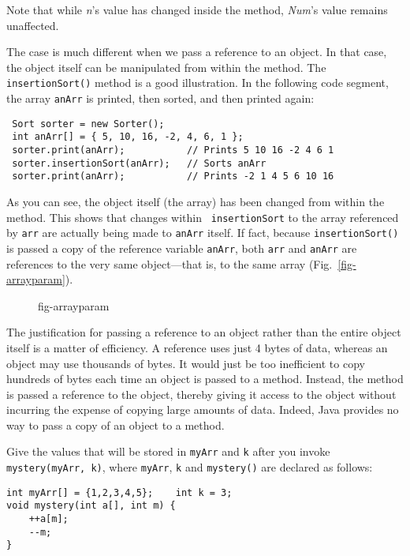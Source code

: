 \noindent Note that while {\it n}'s value has changed inside the
method, {\it Num}'s value remains unaffected.

The case is much different when we pass a reference to an object.  In
that case, the object itself can be manipulated from within the
method.  The {\tt insertionSort()} method is a good illustration.  In
the following code
segment, the array {\tt anArr} is printed, then sorted, and then printed
again:

\begin{jjjlisting}
\begin{lstlisting}
 Sort sorter = new Sorter();
 int anArr[] = { 5, 10, 16, -2, 4, 6, 1 }; 
 sorter.print(anArr);           // Prints 5 10 16 -2 4 6 1
 sorter.insertionSort(anArr);   // Sorts anArr
 sorter.print(anArr);           // Prints -2 1 4 5 6 10 16
\end{lstlisting}
\end{jjjlisting}

\noindent As you can see, the object itself (the array) has been
changed from within the method. This shows that changes within {\tt
insertionSort} to the array referenced by {\tt arr} are actually being
made to {\tt anArr} itself.  If fact, because {\tt insertionSort()} is
passed a copy of the reference variable {\tt anArr}, both {\tt arr}
and {\tt anArr} are references to the very same object---that is, to
the same array (Fig.~\ref{fig-arrayparam}).

\begin{figure}[tbh]
 {fig-arrayparam}
\end{figure}

The justification for passing a reference to an object rather than the
entire object itself is a matter of efficiency.  A reference uses just
4 bytes of data, whereas an object may use thousands of bytes.   It
would just be too inefficient to copy hundreds of bytes each time an
object is passed to a method.  Instead, the method is passed a
reference to the object, thereby giving it access to the object
without incurring the expense of copying large amounts of data.
Indeed, Java provides no way to pass a copy of an object to a method.

\label{self-study-exercise}
\begin{SSTUDY}

\item Give the values that will be stored in {\tt myArr} and {\tt k}
after you invoke {\tt mystery(myArr, k)}, where {\tt myArr}, {\tt k}
and {\tt mystery()} are declared as follows:

\begin{jjjlisting}
\begin{lstlisting}
int myArr[] = {1,2,3,4,5};    int k = 3;
void mystery(int a[], int m) {
    ++a[m];
    --m;
}
\end{lstlisting}
\end{jjjlisting}

\end{SSTUDY}

